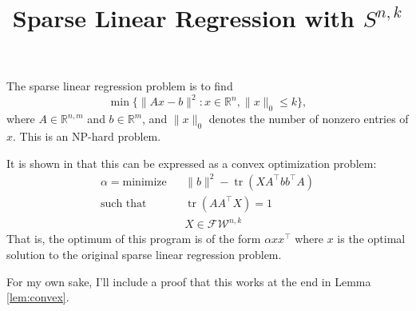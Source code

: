 \documentclass[a4paper]{article}
\author{}
\title{Sparse Linear Regression with $S^{n,k}$}
\newcommand{\FW}{\mathcal{F}\mathcal{W}}
\newcommand{\R}{\mathbb{R}}
\DeclareMathOperator*{\tr}{tr}
\begin{document}
\maketitle

The sparse linear regression problem is to find
\[
    \min \{\|Ax - b\|^2 : x \in \R^n, \|x\|_0 \le k\},
\]
where $A \in \R^{n,m}$ and $b\in \R^m$, and $\|x\|_0$ denotes the number of nonzero entries of $x$. This is an NP-hard problem.

It is shown in \cite{subset} that this can be expressed as a convex optimization problem:
\begin{equation}\label{eq:cvx_prg}
\begin{aligned}
    \alpha = 
    \text{minimize} &&\|b\|^2 - \tr(XA^{\intercal}bb^{\intercal}A)\\
    \text{such that } && \tr(AA^{\intercal}X) = 1\\
                      && X \in \FW^{n,k}
\end{aligned}
\end{equation}
That is, the optimum of this program is of the form $\alpha xx^{\intercal}$ where $x$ is the optimal solution to the original sparse linear regression problem.

For my own sake, I'll include a proof that this works at the end in Lemma \ref{lem:convex}.
\end{document}

